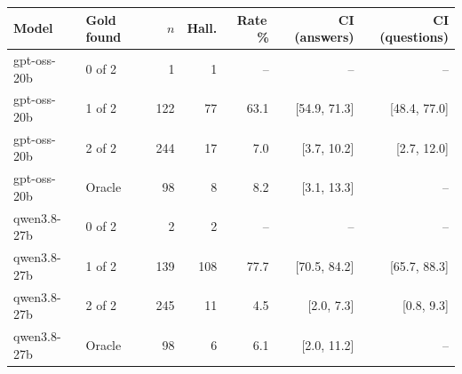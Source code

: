 \begin{tabular}{@{}llrrrrr@{}}
\toprule
Model & Gold found & $n$ & Hall. & Rate\,\% & CI (answers) & CI (questions) \\
\midrule
gpt-oss-20b & 0 of 2 & 1 & 1 & -- & -- & -- \\
gpt-oss-20b & 1 of 2 & 122 & 77 & 63.1 & [54.9, 71.3] & [48.4, 77.0] \\
gpt-oss-20b & 2 of 2 & 244 & 17 & 7.0 & [3.7, 10.2] & [2.7, 12.0] \\
gpt-oss-20b & Oracle & 98 & 8 & 8.2 & [3.1, 13.3] & -- \\
\midrule
qwen3.8-27b & 0 of 2 & 2 & 2 & -- & -- & -- \\
qwen3.8-27b & 1 of 2 & 139 & 108 & 77.7 & [70.5, 84.2] & [65.7, 88.3] \\
qwen3.8-27b & 2 of 2 & 245 & 11 & 4.5 & [2.0, 7.3] & [0.8, 9.3] \\
qwen3.8-27b & Oracle & 98 & 6 & 6.1 & [2.0, 11.2] & -- \\
\bottomrule
\end{tabular}

